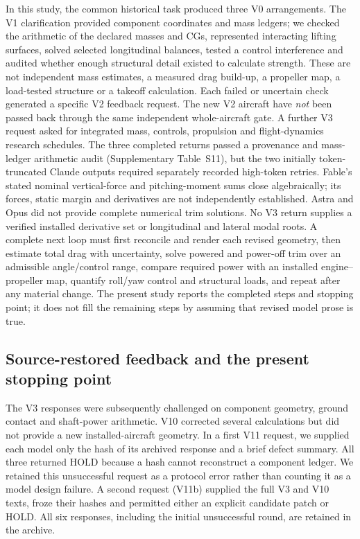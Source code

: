 \documentclass[10pt,letterpaper]{article}
\begin{document}
In this study, the common historical task produced three V0 arrangements. The V1 clarification provided component coordinates and mass ledgers; we checked the arithmetic of the declared masses and CGs, represented interacting lifting surfaces, solved selected longitudinal balances, tested a control interference and audited whether enough structural detail existed to calculate strength. These are not independent mass estimates, a measured drag build-up, a propeller map, a load-tested structure or a takeoff calculation. Each failed or uncertain check generated a specific V2 feedback request. The new V2 aircraft have \emph{not} been passed back through the same independent whole-aircraft gate. A further V3 request asked for integrated mass, controls, propulsion and flight-dynamics research schedules. The three completed returns passed a provenance and mass-ledger arithmetic audit (Supplementary Table~S11), but the two initially token-truncated Claude outputs required separately recorded high-token retries. Fable's stated nominal vertical-force and pitching-moment sums close algebraically; its forces, static margin and derivatives are not independently established. Astra and Opus did not provide complete numerical trim solutions. No V3 return supplies a verified installed derivative set or longitudinal and lateral modal roots. A complete next loop must first reconcile and render each revised geometry, then estimate total drag with uncertainty, solve powered and power-off trim over an admissible angle/control range, compare required power with an installed engine--propeller map, quantify roll/yaw control and structural loads, and repeat after any material change. The present study reports the completed steps and stopping point; it does not fill the remaining steps by assuming that revised model prose is true.

\subsection{Source-restored feedback and the present stopping point}
The V3 responses were subsequently challenged on component geometry, ground contact and shaft-power arithmetic. V10 corrected several calculations but did not provide a new installed-aircraft geometry. In a first V11 request, we supplied each model only the hash of its archived response and a brief defect summary. All three returned HOLD because a hash cannot reconstruct a component ledger. We retained this unsuccessful request as a protocol error rather than counting it as a model design failure. A second request (V11b) supplied the full V3 and V10 texts, froze their hashes and permitted either an explicit candidate patch or HOLD. All six responses, including the initial unsuccessful round, are retained in the archive.
\end{document}
